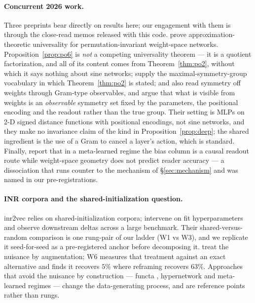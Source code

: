 \documentclass[10pt,twocolumn,letterpaper]{article}
\theoremstyle{definition}
\begin{document}
\paragraph{Concurrent 2026 work.} Three preprints bear directly on results here; our engagement
with them is through the close-read memos released with this code.
\citet{wsn2026expressivity} prove approximation-theoretic universality for permutation-invariant
weight-space networks. Proposition~\ref{prop:po6} is
\emph{not} a competing universality theorem --- it is a quotient factorization, and all of its
content comes from Theorem~\ref{thm:po2}, without which it says nothing about sine networks;
\citet{quasiequiv2026} supply the maximal-symmetry-group vocabulary in which
Theorem~\ref{thm:po2} is stated; and \citet{chiba2026observable} also read symmetry off weights through Gram-type observables, and
argue that what is visible from weights is an \emph{observable} symmetry set fixed by the
parameters, the positional encoding and the readout rather than the true group. Their setting is
MLPs on 2-D signed distance functions with positional encodings, not sine networks, and they make
no invariance claim of the kind in Proposition~\ref{prop:deep}; the shared ingredient is the use of
a Gram to cancel a layer's action, which is standard. Finally, \citet{clustered2026} report that in
a meta-learned regime the
bias column is a causal readout route while weight-space geometry does not predict reader accuracy
--- a dissociation that runs counter to the mechanism of \S\ref{sec:mechanism} and was named in
our pre-registrations.

\paragraph{INR corpora and the shared-initialization question.} inr2vec \citep{deluigi2023inr2vec}
relies on shared-initialization corpora; \citet{papa2024howtotrain} intervene on fit
hyperparameters and observe downstream deltas across a large benchmark. Their shared-versus-random
comparison is one rung-pair of our ladder (W1 vs W3), and we replicate it seed-for-seed as a
pre-registered anchor before decomposing it. \citet{shamsian2024augmentations} treat the nuisance
by augmentation; W6 measures that treatment against an exact alternative and finds it recovers
$5\%$ where reframing recovers $63\%$. Approaches that avoid the nuisance by construction ---
functa \citep{dupont2022functa}, hypernetwork and meta-learned regimes --- change the
data-generating process, and are reference points rather than rungs.
\end{document}
